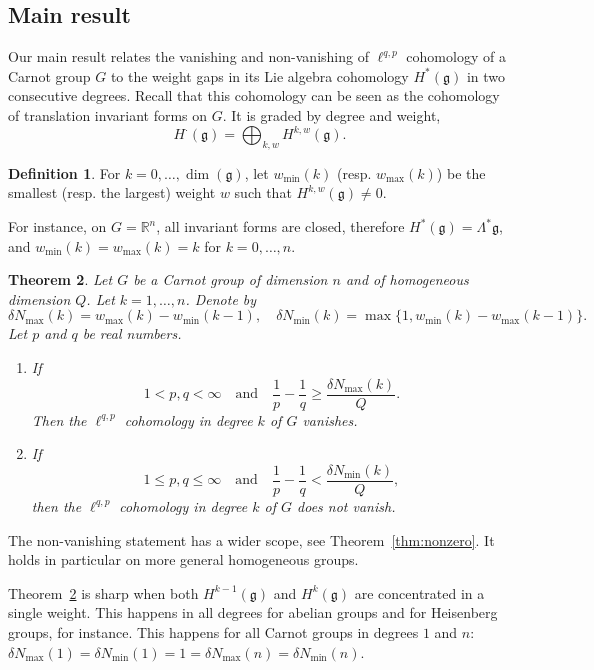 \documentclass[11pt]{article}
\newtheorem{theo}{Theorem}[section]
\theoremstyle{definition}
\newtheorem{defi}[theo]{Definition}
\numberwithin{equation}{section}
\numberwithin{figure}{section}
\numberwithin{table}{section}
\newcommand{\R}{\mathbb{R}}
\begin{document}
\subsection{Main result}

Our main result relates the vanishing and non-vanishing of $\ell^{q,p}$ cohomology of a Carnot group $G$ to the weight gaps in its Lie algebra cohomology $H^*(\mathfrak{g})$ in two consecutive degrees. Recall that this cohomology can be seen as the cohomology of translation invariant forms on $G$. It is graded by degree and weight,
\[
H^\cdot(\mathfrak{g})=\bigoplus_{k,w}H^{k,w}(\mathfrak{g}).
\]

\begin{defi}
For $k=0,\dots,\dim(\mathfrak{g})$, let $w_{\min}(k)$ (resp. $w_{\max}(k)$) be the smallest (resp. the largest) weight $w$ such that $H^{k,w}(\mathfrak{g})\not=0$.
\end{defi}

For instance, on $G=\R^n$, all invariant forms are closed, therefore $H^*(\mathfrak{g}) = \Lambda^* \mathfrak{g}$, and $w_{\min}(k) =w_{\max}(k) = k$ for $k=0, \dots, n$.

\begin{theo}\label{1}
Let $G$ be a Carnot group of dimension $n$ and of homogeneous dimension $Q$. Let $k=1,\dots,n$. Denote by
\[
\delta N_{\max}(k)=w_{\max}(k)-w_{\min}(k-1),\quad \delta N_{\min}(k)=\max\{1,w_{\min}(k)-w_{\max}(k-1)\}.
\]
Let $p$ and $q$ be real numbers.
\begin{enumerate}%
\item \label{1.3.1} If
\[
1<p,q<\infty \quad \text{and}\quad
\frac{1}{p}-\frac{1}{q}\geq\frac{\delta N_{\max}(k)}{Q}.
\]
Then the $\ell^{q,p}$ cohomology in degree $k$ of $G$ vanishes.
\item \label{1.3.2} If
\[
1\leq p,q\leq\infty \quad \text{and}\quad
\frac{1}{p}-\frac{1}{q}<\frac{\delta N_{\min}(k)}{Q},
\]
then the $\ell^{q,p}$ cohomology in degree $k$ of $G$ does not vanish.
\end{enumerate}
\end{theo}

The non-vanishing statement has a wider scope, see Theorem~\ref{thm:nonzero}. It holds in particular on more general homogeneous groups.

Theorem~\ref{1} is sharp when both $H^{k-1}(\mathfrak{g})$ and $H^{k}(\mathfrak{g})$ are concentrated in a single weight. This happens in all degrees for abelian groups and for Heisenberg groups, for instance. This happens for all Carnot groups in degrees $1$ and $n$: $\delta N_{\max}(1)=\delta N_{\min}(1)=1=\delta N_{\max}(n)=\delta N_{\min}(n)$.
\end{document}
